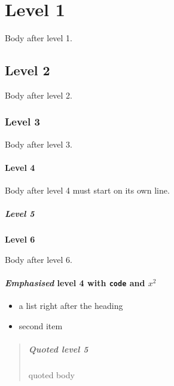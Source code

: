 \section{Level 1}

Body after level 1.

\subsection{Level 2}

Body after level 2.

\subsubsection{Level 3}

Body after level 3.

\paragraph{Level 4}\mbox{}

Body after level 4 must start on its own line.

\subparagraph{Level 5}\mbox{}

\noindent\textbf{Level 6}

Body after level 6.

\paragraph{\textit{Emphasised} level 4 with \texttt{code} and $x^2$}\mbox{}

\begin{itemize}
  \item a list right after the heading
  \item second item
\end{itemize}

\begin{quote}
\subparagraph{Quoted level 5}\mbox{}

quoted body

\end{quote}

